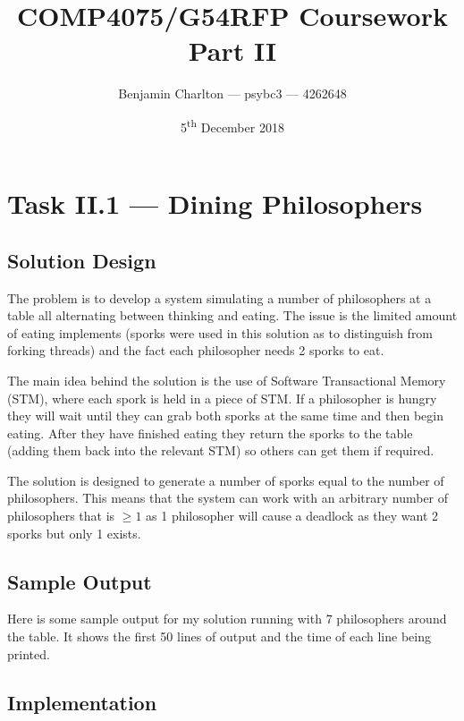 \documentclass[a4paper]{article}
\title{COMP4075/G54RFP Coursework Part II}
\date{5\textsuperscript{th} December 2018}
\author{Benjamin Charlton --- psybc3 --- 4262648}
\begin{document}
\maketitle

\section{Task II.1 --- Dining Philosophers}

\subsection{Solution Design}
The problem is to develop a system simulating a number of philosophers at a table all alternating between thinking and eating.
The issue is the limited amount of eating implements (sporks were used in this solution as to distinguish from forking threads) and the fact each philosopher needs 2 sporks to eat.
\par
The main idea behind the solution is the use of Software Transactional Memory (STM), where each spork is held in a piece of STM\@.
If a philosopher is hungry they will wait until they can grab both sporks at the same time and then begin eating.
After they have finished eating they return the sporks to the table (adding them back into the relevant STM) so others can get them if required.
\par
The solution is designed to generate a number of sporks equal to the number of philosophers.
This means that the system can work with an arbitrary number of philosophers that is \( \ge 1\) as 1 philosopher will cause a deadlock as they want 2 sporks but only 1 exists.

\subsection{Sample Output}
Here is some sample output for my solution running with 7 philosophers around the table.
It shows the first 50 lines of output and the time of each line being printed.
\begin{center}
    \begin{multicols}{2}
    \end{multicols}
\end{center}

\subsection{Implementation}
\end{document}
